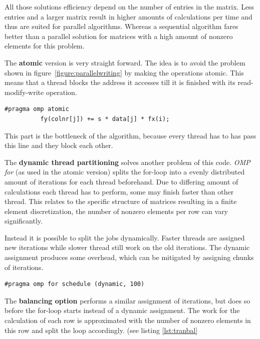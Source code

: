 \documentclass[a4paper,11pt]{scrartcl}
\begin{document}
All those solutions efficiency depend on the number of entries in the matrix.
Less entries and a larger matrix result in higher amounts of calculations per
time and thus are suited for parallel algorithms.
Whereas a sequential algorithm fares better than a parallel solution for
matrices with a high amount of nonzero elements for this problem.

The \textbf{atomic} version is very straight forward. The idea is to avoid the
problem shown in figure~\ref{figure:parallelwriting} by making the operations
atomic. This means that a thread blocks the address it accesses till it is
finished with its read-modify-write operation.

\begin{lstlisting}
#pragma omp atomic
          fy(colnr[j]) += s * data[j] * fx(i);
\end{lstlisting}

This part is the bottleneck of the algorithm, because every thread has to has
pass this line and they block each other.

The \textbf{dynamic thread partitioning} solves another problem of this code.
{\em OMP for}\/ (as used in the atomic version) splits the for-loop into a
evenly distributed amount of iterations for each thread beforehand. Due to
differing amount of calculations each thread has to perform, some may finish
faster than other thread. This relates to the specific structure of matrices
resulting in a finite element discretization, the number of nonzero elements
per row can vary significantly.

Instead it is possible to split the jobs dynamically. Faster threads are
assigned new iterations while slower thread still work on the old iterations.
The dynamic assignment produces some overhead, which can be mitigated by
assigning chunks of iterations.

\begin{lstlisting}
#pragma omp for schedule (dynamic, 100)
\end{lstlisting}

The \textbf{balancing option} performs a similar assignment of iterations, but
does so before the for-loop starts instead of a dynamic assignment. The work
for the calculation of each row is approximated with the number of nonzero
elements in this row and split the loop accordingly. (see listing \ref{lst:tranbal}
\end{document}
